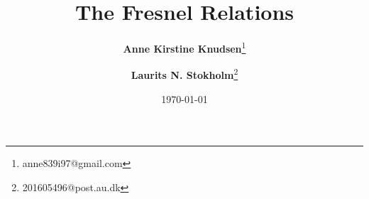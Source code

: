 \documentclass[danish, a4paper, 11pt, onecolumn, oneside]{memoir}
\title{The Fresnel Relations}
\author{%
    \textbf{Anne Kirstine Knudsen}\thanks{anne839i97@gmail.com}
    \and \textbf{Laurits N. Stokholm}\thanks{201605496@post.au.dk}
}
\date{\today}
\begin{document}
\begin{titlingpage}
\maketitle
\end{titlingpage}









\end{document}
